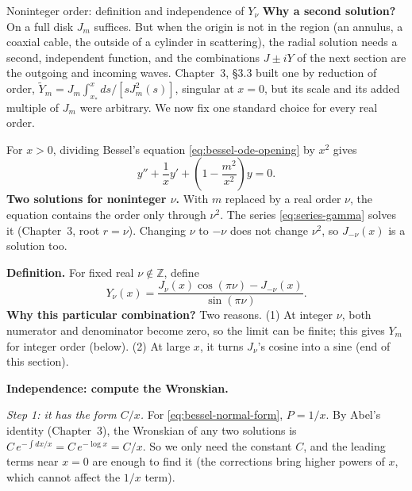 \documentclass[11pt]{beamer}
\begin{document}
\begin{frame}[allowframebreaks=1.00]{Noninteger order: definition and independence of $Y_\nu$}
\footnotesize
\textbf{Why a second solution?} On a full disk $J_m$ suffices. But when the origin is
not in the region (an annulus, a coaxial cable, the outside of a cylinder in
scattering), the radial solution needs a second, independent function, and the
combinations $J\pm iY$ of the next section are the outgoing and incoming waves.
Chapter~3, \S3.3 built one by reduction of order,
$\widetilde Y_m=J_m\int_{x_*}^{x}ds/[sJ_m^2(s)]$, singular at $x=0$, but its scale and its
added multiple of $J_m$ were arbitrary. We now fix one standard choice for every real order.

For $x>0$, dividing Bessel's equation \eqref{eq:bessel-ode-opening} by $x^2$ gives
\begin{equation}
 y''+\frac1x y'+\left(1-\frac{m^2}{x^2}\right)y=0.
 \label{eq:bessel-normal-form}
\end{equation}
\textbf{Two solutions for noninteger \(\nu\).} With \(m\) replaced by a real order \(\nu\), the equation contains
the order only through \(\nu^2\). The series \eqref{eq:series-gamma} solves it (Chapter~3, root \(r=\nu\)). Changing
\(\nu\) to \(-\nu\) does not change \(\nu^2\), so \(J_{-\nu}(x)\) is a solution too.

\textbf{Definition.} For fixed real \(\nu\notin\mathbb Z\), define
\begin{equation}
  Y_\nu(x)=
  \frac{J_\nu(x)\cos(\pi\nu)-J_{-\nu}(x)}{\sin(\pi\nu)}.
  \label{eq:neumann-def}
\end{equation}
\textbf{Why this particular combination?} Two reasons. (1) At integer \(\nu\), both numerator and
denominator become zero, so the limit can be finite; this gives \(Y_m\) for integer order (below).
(2) At large \(x\), it turns \(J_\nu\)'s cosine into a sine (end of this section).

\par\framebreak\par
\textbf{Independence: compute the Wronskian.}

\emph{Step 1: it has the form \(C/x\).} For \eqref{eq:bessel-normal-form}, \(P=1/x\). By Abel's identity
(Chapter~3), the Wronskian of any two solutions is \(C\,e^{-\int dx/x}=C\,e^{-\log x}=C/x\). So we only need the
constant \(C\), and the leading terms near \(x=0\) are enough to find it (the corrections bring higher
powers of \(x\), which cannot affect the \(1/x\) term).


\end{frame}
\end{document}
